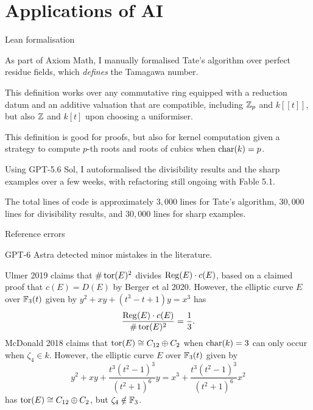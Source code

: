 \section{Applications of AI}

\begin{frame}{Lean formalisation}

As part of Axiom Math, I manually formalised Tate's algorithm over perfect residue fields, which \emph{defines} the Tamagawa number.

\bigskip This definition works over any commutative ring equipped with a reduction datum and an additive valuation that are compatible, including $ \mathbb{Z}_p $ and $ k[[t]] $, but also $ \mathbb{Z} $ and $ k[t] $ upon choosing a uniformiser.

\bigskip This definition is good for proofs, but also for kernel computation given a strategy to compute $ p $-th roots and roots of cubics when $ \operatorname{char}(k) = p $.

\bigskip Using GPT-5.6 Sol, I autoformalised the divisibility results and the sharp examples over a few weeks, with refactoring still ongoing with Fable 5.1.

\bigskip The total lines of code is approximately $ 3,000 $ lines for Tate's algorithm, $ 30,000 $ lines for divisibility results, and $ 30,000 $ lines for sharp examples.

\end{frame}

\begin{frame}{Reference errors}

GPT-6 Astra detected minor mistakes in the literature.

\bigskip Ulmer 2019 claims that $ \#\operatorname{tor}(E)^2 $ divides $ \operatorname{Reg}(E) \cdot c(E) $, based on a claimed proof that $ c(E) = D(E) $ by Berger et al 2020. However, the elliptic curve $ E $ over $ \mathbb{F}_3(t) $ given by $ y^2 + xy + (t^3 - t + 1)y = x^3 $ has
$$ \dfrac{\operatorname{Reg}(E) \cdot c(E)}{\#\operatorname{tor}(E)^2} = \dfrac{1}{3}. $$
McDonald 2018 claims that $ \operatorname{tor}(E) \cong C_{12} \oplus C_2 $ when $ \operatorname{char}(k) = 3 $ can only occur when $ \zeta_4 \in k $. However, the elliptic curve $ E $ over $ \mathbb{F}_3(t) $ given by
$$ y^2 + xy + \dfrac{t^3(t^2 - 1)^3}{(t^2 + 1)^6}y = x^3 + \dfrac{t^3(t^2 - 1)^3}{(t^2 + 1)^6}x^2 $$
has $ \operatorname{tor}(E) \cong C_{12} \oplus C_2 $, but $ \zeta_4 \notin \mathbb{F}_3 $.

\end{frame}

